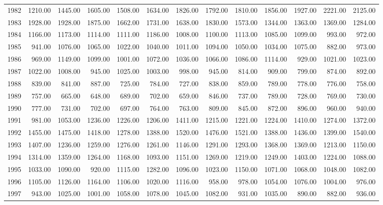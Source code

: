 \begin{longtable}{rrrrrrrrrrrrr}
  1982 & 1210.00 & 1445.00 & 1605.00 & 1508.00 & 1634.00 & 1826.00 & 1792.00 & 1810.00 & 1856.00 & 1927.00 & 2221.00 & 2125.00 \\ 
  1983 & 1928.00 & 1928.00 & 1875.00 & 1662.00 & 1731.00 & 1638.00 & 1830.00 & 1573.00 & 1344.00 & 1363.00 & 1369.00 & 1284.00 \\ 
  1984 & 1166.00 & 1173.00 & 1114.00 & 1111.00 & 1186.00 & 1008.00 & 1100.00 & 1113.00 & 1085.00 & 1099.00 & 993.00 & 972.00 \\ 
  1985 & 941.00 & 1076.00 & 1065.00 & 1022.00 & 1040.00 & 1011.00 & 1094.00 & 1050.00 & 1034.00 & 1075.00 & 882.00 & 973.00 \\ 
  1986 & 969.00 & 1149.00 & 1099.00 & 1001.00 & 1072.00 & 1036.00 & 1066.00 & 1086.00 & 1114.00 & 929.00 & 1021.00 & 1023.00 \\ 
  1987 & 1022.00 & 1008.00 & 945.00 & 1025.00 & 1003.00 & 998.00 & 945.00 & 814.00 & 909.00 & 799.00 & 874.00 & 892.00 \\ 
  1988 & 839.00 & 841.00 & 887.00 & 725.00 & 784.00 & 727.00 & 838.00 & 859.00 & 789.00 & 778.00 & 776.00 & 758.00 \\ 
  1989 & 757.00 & 665.00 & 648.00 & 689.00 & 702.00 & 659.00 & 846.00 & 737.00 & 789.00 & 728.00 & 769.00 & 730.00 \\ 
  1990 & 777.00 & 731.00 & 702.00 & 697.00 & 764.00 & 763.00 & 809.00 & 845.00 & 872.00 & 896.00 & 960.00 & 940.00 \\ 
  1991 & 981.00 & 1053.00 & 1236.00 & 1226.00 & 1206.00 & 1411.00 & 1215.00 & 1221.00 & 1224.00 & 1410.00 & 1274.00 & 1372.00 \\ 
  1992 & 1455.00 & 1475.00 & 1418.00 & 1278.00 & 1388.00 & 1520.00 & 1476.00 & 1521.00 & 1388.00 & 1436.00 & 1399.00 & 1540.00 \\ 
  1993 & 1407.00 & 1236.00 & 1259.00 & 1276.00 & 1261.00 & 1146.00 & 1291.00 & 1293.00 & 1368.00 & 1369.00 & 1213.00 & 1150.00 \\ 
  1994 & 1314.00 & 1359.00 & 1264.00 & 1168.00 & 1093.00 & 1151.00 & 1269.00 & 1219.00 & 1249.00 & 1403.00 & 1224.00 & 1088.00 \\ 
  1995 & 1033.00 & 1090.00 & 920.00 & 1115.00 & 1282.00 & 1096.00 & 1023.00 & 1150.00 & 1071.00 & 1068.00 & 1048.00 & 1082.00 \\ 
  1996 & 1105.00 & 1126.00 & 1164.00 & 1106.00 & 1020.00 & 1116.00 & 958.00 & 978.00 & 1054.00 & 1076.00 & 1004.00 & 976.00 \\ 
  1997 & 943.00 & 1025.00 & 1001.00 & 1058.00 & 1078.00 & 1045.00 & 1082.00 & 931.00 & 1035.00 & 890.00 & 882.00 & 936.00 \\ 

\end{longtable}
